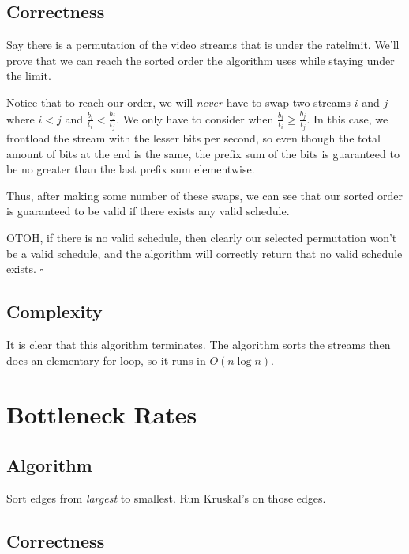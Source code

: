 \documentclass[12pt]{article}
\begin{document}
\subsection{Correctness}

Say there is a permutation of the video streams that is under the ratelimit.
We'll prove that we can reach the sorted order the algorithm uses while staying under the limit.

Notice that to reach our order, we will \textit{never} have to swap
two streams $i$ and $j$ where $i < j$ and $\frac{b_i}{t_i} < \frac{b_j}{t_j}$.
We only have to consider when $\frac{b_i}{t_i} \ge \frac{b_j}{t_j}$.
In this case, we frontload the stream with the lesser bits per second,
so even though the total amount of bits at the end is the same, the
prefix sum of the bits is guaranteed to be no greater than the last
prefix sum elementwise.

Thus, after making some number of these swaps, we can see that
our sorted order is guaranteed to be valid if there exists any valid schedule.

OTOH, if there is no valid schedule, then clearly
our selected permutation won't be a valid schedule, and the algorithm
will correctly return that no valid schedule exists. $\square$

\subsection{Complexity}

It is clear that this algorithm terminates.
The algorithm sorts the streams then does an elementary for loop, so it runs in $\boxed{O(n \log n)}$.

\pagebreak

\section{Bottleneck Rates}

\subsection{Algorithm}

\begin{algorithmic}[1]
    \State Sort edges from \textit{largest} to smallest.
    \State Run Kruskal's on those edges.
\end{algorithmic}

\subsection{Correctness}
\end{document}
